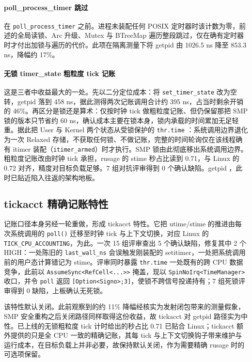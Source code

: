 \paragraph{poll\_process\_timer 跳过}
在 \texttt{poll\_process\_timer} 之前。进程未装配任何 POSIX 定时器时该计数为零，前述的全局读锁、Arc 升级、Mutex 与 BTreeMap 遍历整段跳过，仅在确有定时器时才付出加锁与遍历的代价。此项在隔离测量下将 getpid 由 1026.5 ns 降至 853.3 ns，降幅约 17\%。

\paragraph{无锁 timer\_state 粗粒度 tick 记账}
这是三者中收益最大的一处。先以二分定位成本：将 \texttt{set\_timer\_state} 改为空转，getpid 落到 458 ns，据此测得两次记账调用合计约 395 ns，占当时剩余开销的 46\%。再区分是锁还是算术：仅按时钟 tick 做粗粒度记账、但仍保留那把 SMP 锁的版本只节省约 60 ns，确认成本主要在锁本身，锁内承载的时间累加无足轻重。据此把 User 与 Kernel 两个状态从受锁保护的 \texttt{thr.time} ：系统调用边界退化为一次 Relaxed 存储，不获取任何锁、不做记账，完整的时间轮询仅在该线程确有 itimer 装配（\texttt{itimer\_armed}）时才执行。SMP 锁由此彻底移出系统调用边界。粗粒度记账改由时钟 tick 承担，rusage 的 stime 秒占比读到 0.71，与 Linux 的 0.72 对齐，精度对目标负载足够。7 组对抗评审得到 0 个确认缺陷。getpid ，此时已贴近陷入往返的架构地板。

\subsection{tickacct 精确记账特性}

记账口径本身另经一轮重做，形成 tickacct 特性。它把 utime/stime 的推进由每次系统调用的 \texttt{poll()} 迁移至时钟 tick 与上下文切换，对应 Linux 的 \texttt{TICK\_CPU\_ACCOUNTING}，为此。一次 15 组评审查出 5 个确认缺陷，修复其中 2 个 HIGH：一处陈旧的 \texttt{last\_wall\_ns} 会误触发刚装配的 setitimer，一处把系统调用前的用户态计算错记为 stime。评审同时暴露 \texttt{thr.time} 一处既有的跨 CPU 数据竞争，此前以 \texttt{AssumeSync<RefCell<...>>} 掩盖，现以 \texttt{SpinNoIrq<TimeManager>} 收口，并令 \texttt{poll} 返回 \texttt{[Option<Signo>;3]}，使锁不跨信号投递持有；7 组死锁评审得到 0 缺陷，上板确认无死锁。

该特性默认关闭。此前观察到的约 11\% 降幅经核实为发射闭包带来的测量假象，SMP 安全重构之后关闭路径同样取得这份收益，故 tickacct 对 getpid 路径实为中性。已上线的无锁粗粒度 tick 计时给出的秒占比 0.71 已贴合 Linux；tickacct 额外提供的只是全 CPU 一致的精确记账，其每 tick 与上下文切换钩子带来维护与运行成本，在目标负载上并非必要，故保持默认关闭，作为需要精确 rusage 时的可选项保留。

